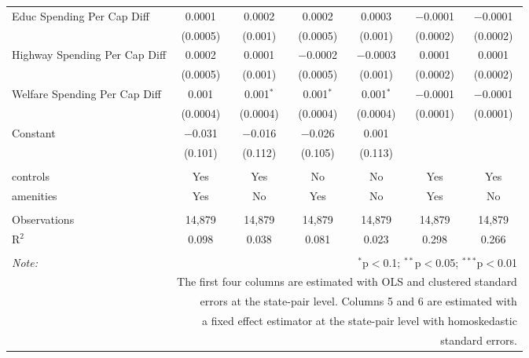 \begin{table}[!htbp]
\begin{tabular}{@{\extracolsep{5pt}}lcccccc}
  Educ Spending Per Cap Diff & 0.0001 & 0.0002 & 0.0002 & 0.0003 & $-$0.0001 & $-$0.0001 \\ 
  & (0.0005) & (0.001) & (0.0005) & (0.001) & (0.0002) & (0.0002) \\ 
  Highway Spending Per Cap Diff & 0.0002 & 0.0001 & $-$0.0002 & $-$0.0003 & 0.0001 & 0.0001 \\ 
  & (0.0005) & (0.001) & (0.0005) & (0.001) & (0.0002) & (0.0002) \\ 
  Welfare Spending Per Cap Diff & 0.001 & 0.001$^{*}$ & 0.001$^{*}$ & 0.001$^{*}$ & $-$0.0001 & $-$0.0001 \\ 
  & (0.0004) & (0.0004) & (0.0004) & (0.0004) & (0.0001) & (0.0001) \\ 
  Constant & $-$0.031 & $-$0.016 & $-$0.026 & 0.001 &  &  \\ 
  & (0.101) & (0.112) & (0.105) & (0.113) &  &  \\ 
 \hline \\[-1.8ex] 
controls & Yes & Yes & No & No & Yes & Yes \\ 
amenities & Yes & No & Yes & No & Yes & No \\ 
\hline \\[-1.8ex] 
Observations & 14,879 & 14,879 & 14,879 & 14,879 & 14,879 & 14,879 \\ 
R$^{2}$ & 0.098 & 0.038 & 0.081 & 0.023 & 0.298 & 0.266 \\ 
\hline 
\hline \\[-1.8ex] 
\textit{Note:}  & \multicolumn{6}{r}{$^{*}$p$<$0.1; $^{**}$p$<$0.05; $^{***}$p$<$0.01} \\ 
 & \multicolumn{6}{r}{The first four columns are estimated with OLS and clustered standard} \\ 
 & \multicolumn{6}{r}{ errors at the state-pair level. Columns 5 and 6 are estimated with} \\ 
 & \multicolumn{6}{r}{a fixed effect estimator at the state-pair level with homoskedastic} \\ 
 & \multicolumn{6}{r}{standard errors.} \\ 
\end{tabular} 
\end{table} 
